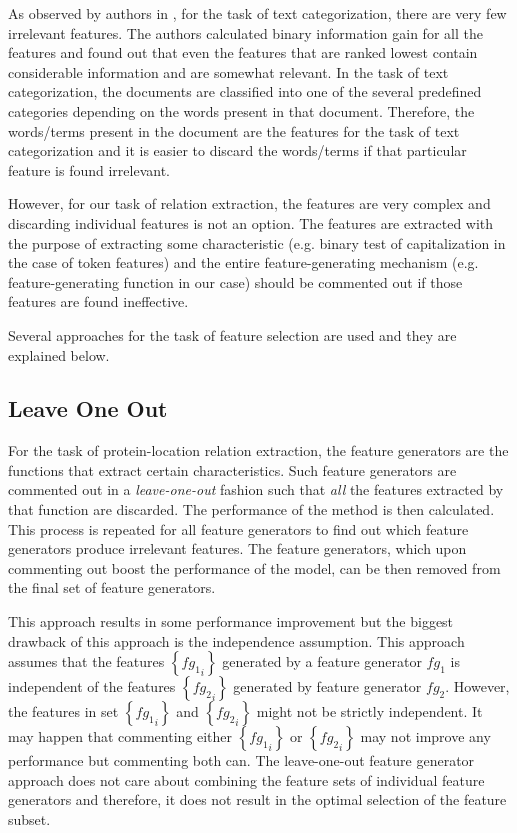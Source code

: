As observed by authors in \cite{joachims1998text}, for the task of text categorization, there are very few irrelevant features. The authors calculated binary information gain for all the features and found out that even the features that are ranked lowest contain considerable information and are somewhat relevant. In the task of text categorization, the documents are classified into one of the several predefined categories depending on the words present in that document. Therefore, the words/terms present in the document are the features for the task of text categorization and it is easier to discard the words/terms if that particular feature is found irrelevant.

However, for our task of relation extraction, the features are very complex and discarding individual features is not an option. The features are extracted with the purpose of extracting some characteristic (e.g. binary test of capitalization in the case of token features) and the entire feature-generating mechanism (e.g. feature-generating function in our case) should be commented out if those features are found ineffective.

Several approaches for the task of feature selection are used and they are explained below.

\subsection{Leave One Out}\label{subsec:LeaveOneOut}

For the task of protein-location relation extraction, the feature generators are the functions that extract certain characteristics. Such feature generators are commented out in a \emph{leave-one-out} fashion such that \emph{all} the features extracted by that function are discarded. The performance of the method is then calculated. This process is repeated for all feature generators to find out which feature generators produce irrelevant features. The feature generators, which upon commenting out boost the performance of the model, can be then removed from the final set of feature generators.

This approach results in some performance improvement but the biggest drawback of this approach is the independence assumption. This approach assumes that the features $\left\lbrace {fg_1}_i \right\rbrace$ generated by a feature generator $fg_1$ is independent of the features $\left\lbrace {fg_2}_i \right\rbrace$ generated by feature generator $fg_2$. However, the features in set $\left\lbrace {fg_1}_i \right\rbrace$ and $\left\lbrace {fg_2}_i \right\rbrace$ might not be strictly independent. It may happen that commenting either $\left\lbrace {fg_1}_i \right\rbrace$ or $\left\lbrace {fg_2}_i \right\rbrace$ may not improve any performance but commenting both can. The leave-one-out feature generator approach does not care about combining the feature sets of individual feature generators and therefore, it does not result in the optimal selection of the feature subset.


